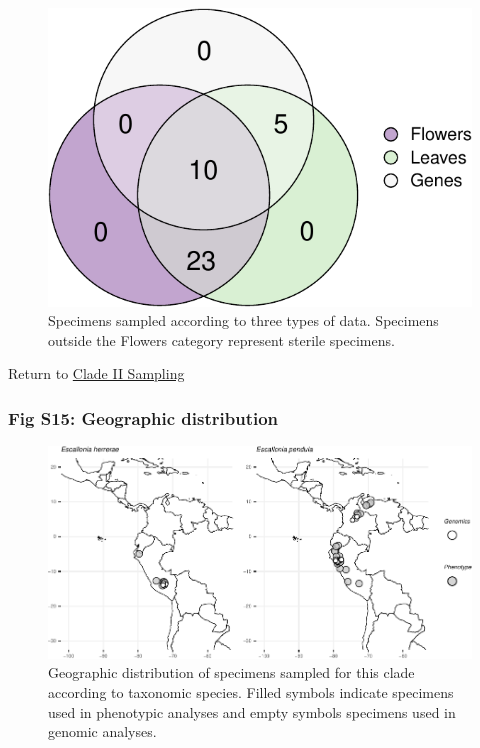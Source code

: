 \documentclass[
  11pt,
]{article}
\begin{document}
\begin{figure}

{\centering \includegraphics{Supplementary_Material_files/figure-latex/CladeIIVennDiagram-1} 

}

\caption{Specimens sampled according to three types of data. Specimens outside the Flowers category represent sterile specimens.}\label{fig:CladeIIVennDiagram}
\end{figure}

Return to \protect\hyperlink{sampling-2}{Clade II Sampling}
\pagebreak

\hypertarget{fig-s15-geographic-distribution}{%
\subsubsection{Fig S15: Geographic distribution}\label{fig-s15-geographic-distribution}}

\begin{figure}

{\centering \includegraphics{Supplementary_Material_files/figure-latex/CladeIIsamplingMaps-1} 

}

\caption{Geographic distribution of specimens sampled for this clade according to taxonomic species. Filled symbols indicate specimens used in phenotypic analyses and empty symbols specimens used in genomic analyses.}\label{fig:CladeIIsamplingMaps}
\end{figure}
\end{document}
